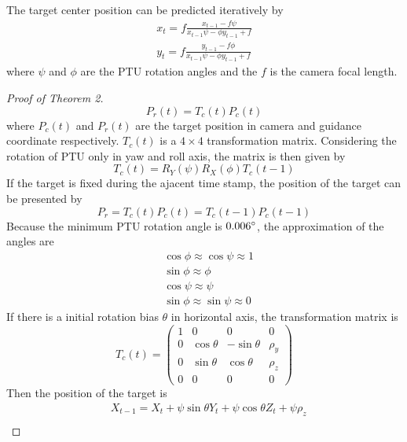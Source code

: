 \documentclass[journal,article,submit,moreauthors,pdftex,10pt,a4paper]{mdpi}
\begin{document}
\begin{Theorem}
The target center position can be predicted iteratively by
\begin{align}
\label{eq:prev_predict_curr}
x_{t} = f\frac{x_{t-1} - f\psi }{x_{t-1}  \psi  - \phi y_{t-1} + f} \\
y_{t} = f\frac{y_{t-1} -f\phi}{  x_{t-1} \psi - \phi y_{t-1} + f}
\end{align}
where $\psi$ and $\phi$ are the PTU rotation angles and the $f$ is the camera focal length.
\end{Theorem}
\begin{proof}[Proof of Theorem 2]

\begin{equation}
P_r(t) = T_c(t) P_c(t)
\end{equation}
where $P_c(t)$ and $P_r(t)$ are the target position in camera and guidance coordinate respectively. $T_c(t)$ is a $4 \times 4$ transformation matrix. 
Considering the rotation of PTU only in yaw and roll axis, the matrix is then given by
\begin{equation}
T_c(t) = R_Y(\psi)R_X(\phi)T_c(t-1)
\end{equation}
If the target is fixed during the ajacent time stamp, the position of the target can be presented by
\begin{equation}
P_r = T_c(t) P_c(t) =T_c(t-1) P_c(t-1)
\end{equation}
Because the minimum PTU rotation angle is $0.006 \degree$, the approximation of the angles are
\begin{align}
&\cos \phi \approx \cos \psi \approx 1 \\
&\sin \phi \approx \phi \\
&\cos \psi \approx \psi \\
&\sin \phi \approx \sin \psi \approx 0
\end{align}
If there is a initial rotation bias $\theta$ in horizontal axis, the transformation matrix is 
\begin{equation}
T_c(t) =\begin{pmatrix} 1 & 0 & 0 & 0 \\ 0 & \cos \theta & -\sin \theta & \rho_y \\0 & \sin \theta & \cos \theta & \rho_z \\ 0 & 0 & 0 &0 \end{pmatrix}
\end{equation}
Then the position of the target is
\begin{align}
&X_{t-1} = X_t + \psi \sin \theta Y_t + \psi \cos \theta Z_t + \psi \rho_z \\

\end{align}
\end{proof}
\end{document}
